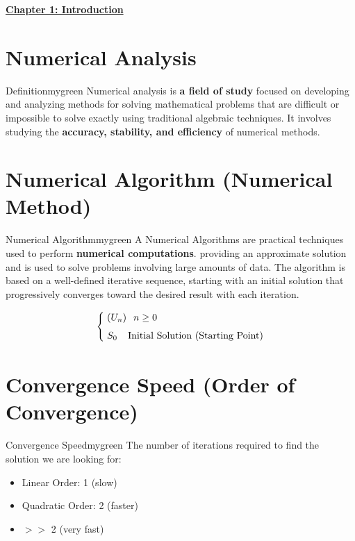 \begin{center}
    \Huge{\textbf{\underline{Chapter 1: Introduction}}}
\end{center}

\vspace{0.35cm}


\section{Numerical Analysis}
\begin{prettyBox}{Definition}{mygreen}
Numerical analysis is \textbf{a field of study} focused on developing and analyzing methods for
solving mathematical problems that are difficult or impossible to solve exactly using traditional
algebraic techniques. It involves studying the \textbf{accuracy, stability, and efficiency} of numerical 
methods.
\end{prettyBox}

\vspace{0.35cm}
\section{Numerical Algorithm (Numerical Method)}
\begin{prettyBox}{Numerical Algorithm}{mygreen}
A Numerical Algorithms are practical techniques used to perform \textbf{numerical computations}. providing 
an approximate solution and is used to solve problems involving large amounts of data.
The algorithm is based on a well-defined iterative sequence, starting with
an initial solution that progressively converges toward the desired result with each iteration.

\[
\begin{cases}
    \hspace{0.1cm}(U_n) & \hspace{-0.1cm}n \geq 0 \\[0.15cm]
    \hspace{0.1cm}S_0 & \hspace{-0.3cm} \text{Initial Solution (Starting Point)}
\end{cases}
\]
\end{prettyBox}
\vspace{0.35cm}

\section{Convergence Speed (Order of Convergence)}
\begin{prettyBox}{Convergence Speed}{mygreen}
The number of iterations required to find the solution we are looking for:
\begin{itemize}
    \item Linear Order: 1 (slow)
    \item Quadratic Order: 2 (faster)
    \item \(>>\) 2 (very fast)
\end{itemize}
\end{prettyBox}

